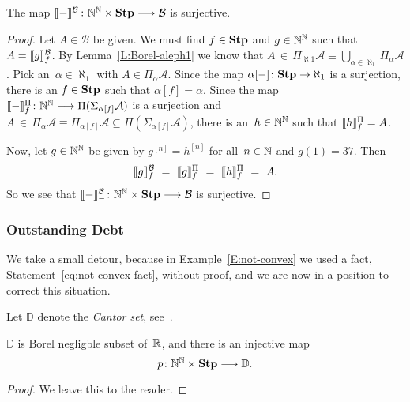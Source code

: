 \begin{prop}
\label{P:bhier-surjective}
The map $\decode{-}^\mathcal{B}_{-}\colon \N^\N\times \Stump
\longrightarrow \mathcal{B}$
is surjective.
\end{prop}
\begin{proof}
Let $A\in\mathcal{B}$ be given.
We must find $f\in\mathbf{Stp}$
and $g\in\mathbb{N}^{\mathbb{N}}$ such that $A=\decode{g}^{\mathcal{B}}_f$.
By Lemma~\ref{L:Borel-aleph1}
we know that $A\,\in\,\Pi_{\aleph1} \mathcal{A}
\equiv \bigcup_{\alpha\in\aleph_1} \Pi_\alpha\mathcal{A}$.
Pick an~$\alpha\in \aleph_1$ with $A\in \Pi_\alpha \mathcal{A}$.
Since the map $\alpha[-]\colon \mathbf{Stp} \rightarrow \aleph_1$
is a surjection,
there is an $f\in\mathbf{Stp}$
such that $\alpha[f] = \alpha$.
Since the map $\decode{-}^{\Pi}_{f}
\colon \N^\N \longrightarrow \Pi(\Sigma_{\alpha[f]} \mathcal{A})$
is a surjection
and $A\,\in\, \Pi_{\alpha} \mathcal{A}
\equiv \Pi_{\alpha[f]}\mathcal{A}
\subseteq \Pi(\Sigma_{\alpha[f]}\mathcal{A})$,
there is an~$h\in \mathbb{N}^{\mathbb{N}}$
such that $\decode{h}^{\Pi}_f = A$.

Now, let $g\in\mathbb{N}^{\mathbb{N}}$ be given by
$g^{[n]} = h^{[n]}$ for all~$n\in\mathbb{N}$
and $g(1)= 37$.
Then
\begin{equation*}
\decode{g}^{\mathcal{B}}_f
\ =\ 
\decode{g}^{\Pi}_f
\ =\ 
\decode{h}^{\Pi}_f
\ =\ 
A.
\end{equation*}
So we see that $\decode{-}^{\mathcal{B}}_{-}
\colon \N^\N\times\Stump\longrightarrow \mathcal{B}$
is surjective.
\end{proof}

\subsubsection{Outstanding Debt}$\,$\\
We take a small detour,
because in Example~\ref{E:not-convex}
we used a fact, Statement~\eqref{eq:not-convex-fact},
without proof,
and we are now in a position
to correct this situation.
\begin{nt}
Let $\mathbb{D}$ denote the \emph{Cantor set},
see~\cite[Examples~17.9c]{Willard70}.
\end{nt}
\begin{lem}
\label{L:bhier-disc-injection}
$\mathbb{D}$ is Borel negligble
subset of~$\mathbb{R}$,
and there is an injective map
\begin{equation*}
p\colon \mathbb{N}^{\mathbb{N}} \times \mathbf{Stp} \longrightarrow \mathbb{D}.
\end{equation*}
\end{lem}
\begin{proof}
We leave this to the reader.
\end{proof}

